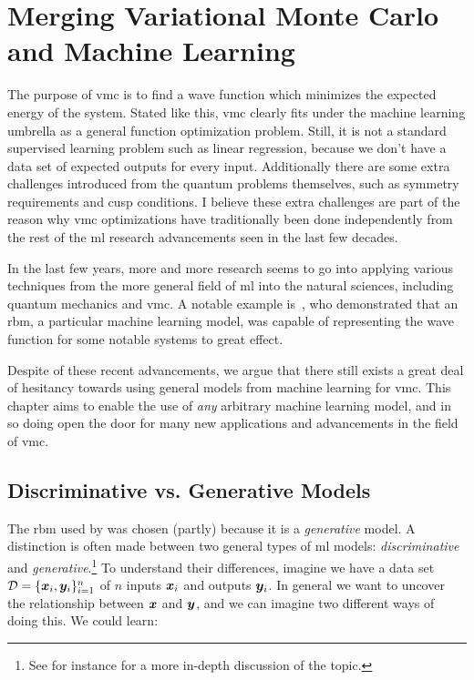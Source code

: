 \documentclass[Thesis.tex]{subfiles}
\begin{document}
\chapter{Merging Variational Monte Carlo and Machine Learning}
\label{chp:mergin-vmc-with-ml}

The purpose of \gls{vmc} is to find a wave function which minimizes the expected
energy of the system. Stated like this, \gls{vmc} clearly fits under the machine
learning umbrella as a general function optimization problem. Still, it is not a
standard supervised learning problem such as linear regression, because we don't
have a data set of expected outputs for every input. Additionally there are some
extra challenges introduced from the quantum problems themselves, such as
symmetry requirements and cusp conditions. I believe these extra challenges are
part of the reason why \gls{vmc} optimizations have traditionally been done
independently from the rest of the \gls{ml} research advancements seen in the
last few decades.

In the last few years, more and more research seems to go into applying various
techniques from the more general field of \gls{ml} into the natural sciences,
including quantum mechanics and \gls{vmc}. A notable example
is~\textcite{Carleo602}, who demonstrated that an \gls{rbm}, a particular
machine learning model, was capable of representing the wave function for some
notable systems to great effect.

Despite of these recent advancements, we argue that there still exists a
great deal of hesitancy towards using general models from machine learning for
\gls{vmc}. This chapter aims to enable the use of \emph{any} arbitrary machine
learning model, and in so doing open the door for many new applications and
advancements in the field of \gls{vmc}.


\section{Discriminative vs. Generative Models}


The \gls{rbm} used by \textcite{Carleo602} was chosen (partly) because it is a
\emph{generative} model. A distinction is often made between two general types
of \gls{ml} models: \emph{discriminative} and \emph{generative}.\footnote{See
for instance \textcite{Ng-2001} for a more in-depth discussion of the topic.} To
understand their differences, imagine we have a data set $\mathcal{D} = \{\bm{x}_i,
\bm{y}_i\}_{i=1}^n$ of $n$ inputs $\bm{x}_i$ and outputs $\bm{y}_i$. In general we want
to uncover the relationship between $\bm{x}$ and $\bm{y}$, and we can imagine two
different ways of doing this. We could learn:
\end{document}
